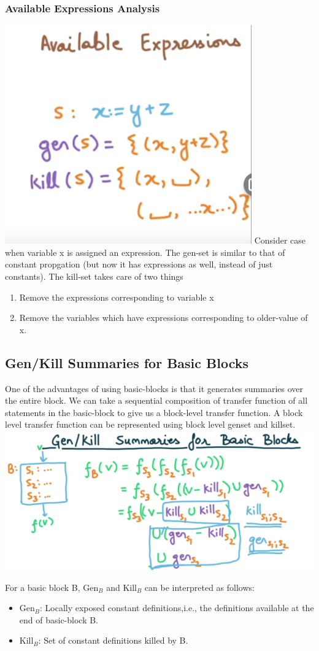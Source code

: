 \subsubsection{Available Expressions Analysis}
\includegraphics[scale=0.5]{images/89_2.png}
\newline 
Consider case when variable x is assigned an expression. The gen-set is similar to that of constant propgation (but now it has expressions as well, instead of just constants). The kill-set takes care of two things 
\begin{enumerate}
    \item Remove the expressions corresponding to variable x 
    \item Remove the variables which have expressions corresponding to older-value of x.
\end{enumerate}

\subsection{Gen/Kill Summaries for Basic Blocks}
One of the advantages of using basic-blocks is that it generates summaries over the entire block. We can take a sequential composition of transfer function of all statements in the basic-block to give us a block-level transfer function.
A block level transfer function can be represented using block level genset and killset.
\includegraphics[scale=0.5]{images/89_3.png}

For a basic block B, Gen$_B$ and Kill$_B$ can be interpreted as follows:
\begin{itemize}
    \item Gen$_B$: Locally exposed constant definitions,i.e., the definitions available at the end of basic-block B.
    \item Kill$_B$: Set of constant definitions killed by B.
\end{itemize}
